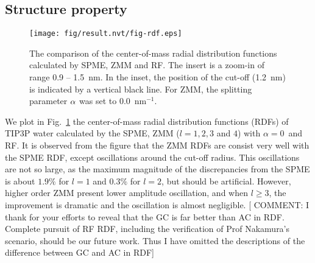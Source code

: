 \documentclass[a4paper,preprint,unsortedaddress,onecolumn,fleqn]{revtex4}
\begin{document}
\subsection{Structure property}

\begin{figure}[tbp]
\centering
\texttt{[image: fig/result.nvt/fig-rdf.eps]}
\caption{The comparison of the center-of-mass radial distribution functions
calculated by SPME, ZMM and RF. The insert is a zoom-in of range 0.9 --
1.5~nm. In the inset, the position of the cut-off (1.2~nm) is indicated by a
vertical black line. For ZMM, the splitting parameter $\protect\alpha $ was
set to 0.0~$\text{nm}^{-1}$. }
\label{fig:rdf}
\end{figure}

We plot in Fig.~\ref{fig:rdf} the center-of-mass radial distribution
functions (RDFs) of TIP3P water calculated by the SPME, ZMM ($l=1,2,3$ and $%
4 $) with $\alpha =0$\ and RF. It is observed from the figure that the ZMM
RDFs are consist very well with the SPME RDF, except oscillations around the
cut-off radius. This oscillations are not so large, as the maximum magnitude
of the discrepancies from the SPME is about $1.9\%$ for $l=1$ and ${0.3\%}$
for $l=2$, %
but should be artificial. However, higher order ZMM present lower amplitude
oscillation, and when $l\geq 3$, the improvement is dramatic and the
oscillation is almost negligible. [ {\color{blue}COMMENT: I thank for your
efforts to reveal that the GC is far better than AC in RDF. Complete pursuit
of RF RDF, including the verification of Prof Nakamura's scenario, should be
our future work. Thus I have omitted the descriptions of the difference
between GC and AC in RDF]} %
\end{document}
